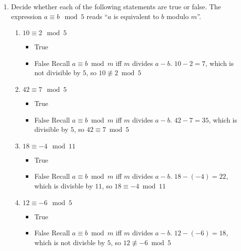 \documentclass[11pt, preview]{standalone} %
\newcommand{\modcomphint}{Recall to compute $a \bmod b$, we divide $a$ by $b$ to write $a = b\lfloor \frac{a}{b} \rfloor + r$. The answer is $x = r$.}
\newcommand{\modequivhint}{Recall $a \equiv b \bmod m$ iff $m$ divides $a-b$.}
\newcommand{\modsol}[4]{We can express $#1$ as $#2 \times #4 + #3$, so the remainder $#3$ is the solution.}
\newcommand{\equivclass}[3]{The equivalence class of $#1 \bmod #2$ is $\{...#3...\}$, obtained by adding integer multiples of $#2$ to $#1$.}
\begin{document}
\begin{enumerate}
\begin{enumerate}
\item $x = -45 \mod 47$
\begin{Freeform}{2}
\Hint \modcomphint
\Solution \modsol{-45}{47}{2}{(-1)} \equivclass{2}{47}{-92,\ -45,\ 2,\ 49,\ 96}
\end{Freeform}
\end{enumerate}

\item Decide whether each of the following statements are true or false. The expression $a \equiv b \mod 5$ reads ``$a$ is equivalent to $b$ modulo $m$''.

\begin{enumerate}
\item $10 \equiv 2 \mod 5$
\begin{Choices}
\begin{itemize}
\FalseChoice\item True 
\TrueChoice\item False
\Hint \modequivhint
\Solution $10 - 2 = 7$, which is not divisible by $5$, so $10 \not\equiv 2 \bmod 5$
\end{itemize}
\end{Choices}

\item $42 \equiv 7 \mod 5$
\begin{Choices} 
\begin{itemize}
\TrueChoice\item True
\FalseChoice\item False
\Hint \modequivhint
\Solution $42 - 7 = 35$, which is divisible by $5$, so $42 \equiv 7 \bmod 5$
\end{itemize}
\end{Choices}

\item $18 \equiv -4 \mod 11$
\begin{Choices} 
\begin{itemize}
\TrueChoice\item True
\FalseChoice\item False
\Hint \modequivhint
\Solution $18 - (-4) = 22$, which is divisble by $11$, so $18 \equiv -4 \bmod 11$
\end{itemize}
\end{Choices}

\item $12 \equiv - 6 \mod 5$
\begin{Choices} 
\begin{itemize}
\FalseChoice\item True
\TrueChoice\item False
\Hint \modequivhint
\Solution $12 - (-6) = 18$, which is not divisble by $5$, so $12 \not\equiv -6 \bmod 5$
\end{itemize}
\end{Choices}


\end{enumerate}
\end{enumerate}
\end{document}
